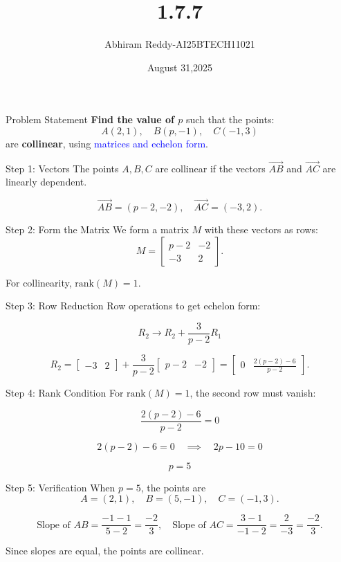 \documentclass{beamer}
\title 
{1.7.7}
\date{August 31,2025}
\author 
{Abhiram Reddy-AI25BTECH11021}
\begin{document}
\frame{\titlepage}
\begin{frame}{Problem Statement}
\textbf{Find the value of \( p \)} such that the points:
\[
A(2,1), \quad B(p, -1), \quad C(-1,3)
\]
are \textbf{collinear}, using \textcolor{blue}{matrices and echelon form}.
\end{frame}

\begin{frame}{Step 1: Vectors}
The points $A, B, C$ are collinear if the vectors 
$\overrightarrow{AB}$ and $\overrightarrow{AC}$ are linearly dependent.

\[
\overrightarrow{AB} = (p-2, -2), \quad 
\overrightarrow{AC} = (-3, 2).
\]
\end{frame}

\begin{frame}{Step 2: Form the Matrix}
We form a matrix $M$ with these vectors as rows:
\[
M = \begin{bmatrix}
p-2 & -2 \\
-3 & 2
\end{bmatrix}.
\]

For collinearity, $\text{rank}(M) = 1$.
\end{frame}

\begin{frame}{Step 3: Row Reduction}
Row operations to get echelon form:

\[
R_2 \to R_2 + \frac{3}{p-2}R_1
\]

\[
R_2 = \begin{bmatrix} -3 & 2 \end{bmatrix} 
+ \frac{3}{p-2}\begin{bmatrix} p-2 & -2 \end{bmatrix}
= \begin{bmatrix} 0 & \frac{2(p-2)-6}{p-2} \end{bmatrix}.
\]
\end{frame}

\begin{frame}{Step 4: Rank Condition}
For $\text{rank}(M) = 1$, the second row must vanish:

\[
\frac{2(p-2)-6}{p-2} = 0
\]

\[
2(p-2) - 6 = 0 \quad \implies \quad 2p - 10 = 0
\]

\[
\boxed{p = 5}
\]
\end{frame}

\begin{frame}{Step 5: Verification}
When $p=5$, the points are
\[
A = (2,1), \quad B = (5,-1), \quad C = (-1,3).
\]

\[
\text{Slope of } AB = \frac{-1-1}{5-2} = \frac{-2}{3}, \quad 
\text{Slope of } AC = \frac{3-1}{-1-2} = \frac{2}{-3} = \frac{-2}{3}.
\]

Since slopes are equal, the points are collinear.
\end{frame}
\end{document}
